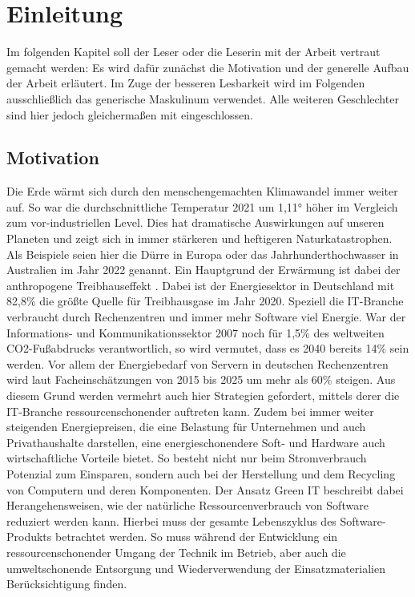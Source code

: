 \documentclass[utf8,biblatex]{lni}
\begin{document}
\section{Einleitung}
Im folgenden Kapitel soll der Leser oder die Leserin mit der Arbeit vertraut gemacht werden: Es wird dafür zunächst die Motivation und der generelle Aufbau der Arbeit erläutert. 
\newline
Im Zuge der besseren Lesbarkeit wird im Folgenden ausschließlich das generische Maskulinum verwendet. Alle weiteren Geschlechter sind hier jedoch gleichermaßen mit eingeschlossen.

\subsection{Motivation}
Die Erde wärmt sich durch den menschengemachten Klimawandel immer weiter auf. So war die durchschnittliche Temperatur 2021 um 1,11° höher im Vergleich zum vor-industriellen Level. \cite{WMO22} Dies hat dramatische Auswirkungen auf unseren Planeten und zeigt sich in immer stärkeren und heftigeren Naturkatastrophen. Als Beispiele seien hier die Dürre in Europa oder das Jahrhunderthochwasser in Australien im Jahr 2022 genannt. Ein Hauptgrund der Erwärmung ist dabei der anthropogene Treibhauseffekt \cite{bpb22}. Dabei ist der Energiesektor in Deutschland mit 82,8\% die größte Quelle für Treibhausgase im Jahr 2020. \cite{UBA22} 
\newline \newline
Speziell die IT-Branche verbraucht durch Rechenzentren und immer mehr Software viel Energie. War der Informations- und Kommunikationssektor 2007 noch für 1,5\% des weltweiten CO2-Fußabdrucks verantwortlich, so wird vermutet, dass es 2040 bereits 14\% sein werden. \cite{Podder20} Vor allem der Energiebedarf von Servern in deutschen Rechenzentren wird laut Facheinschätzungen von 2015 bis 2025 um mehr als 60\% steigen. \cite{BMUV20} Aus diesem Grund werden vermehrt auch hier Strategien gefordert, mittels derer die IT-Branche ressourcenschonender auftreten kann. Zudem bei immer weiter steigenden Energiepreisen, die eine Belastung für Unternehmen und auch Privathaushalte darstellen, eine energieschonendere Soft- und Hardware auch wirtschaftliche Vorteile bietet. So besteht nicht nur beim Stromverbrauch Potenzial zum Einsparen, sondern auch bei der Herstellung und dem Recycling von Computern und deren Komponenten.\cite{Murugesan08}
\newline \newline
Der Ansatz Green IT beschreibt dabei Herangehensweisen, wie der natürliche Ressourcenverbrauch von Software reduziert werden kann. Hierbei muss der gesamte Lebenszyklus des Software-Produkts betrachtet werden. So muss während der Entwicklung ein ressourcenschonender Umgang der Technik im Betrieb, aber auch die umweltschonende Entsorgung und Wiederverwendung der Einsatzmaterialien Berücksichtigung finden. \cite{Lackes18}
\end{document}
